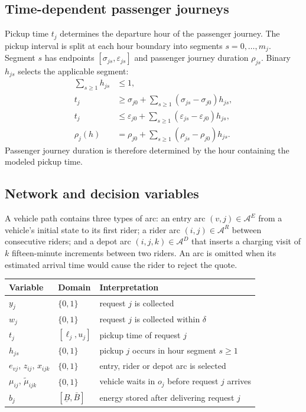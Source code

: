 \subsection{Time-dependent passenger journeys}

Pickup time $t_j$ determines the departure hour of the passenger journey. The pickup interval is split
at each hour boundary into segments $s=0,\ldots,m_j$. Segment $s$ has endpoints
$[\sigma_{js},\varepsilon_{js}]$ and passenger journey duration $\rho_{js}$. Binary $h_{js}$ selects
the applicable segment:
\begin{align}
  \textstyle\sum_{s\geq1} h_{js} &\leq 1, \\
  t_j &\geq \sigma_{j0} + \textstyle\sum_{s\geq1}(\sigma_{js}-\sigma_{j0})h_{js}, \\
  t_j &\leq \varepsilon_{j0} + \textstyle\sum_{s\geq1}(\varepsilon_{js}-\varepsilon_{j0})h_{js}, \\
  \rho_j(h) &= \rho_{j0} + \textstyle\sum_{s\geq1}(\rho_{js}-\rho_{j0})h_{js}.
  \label{eq:ride-duration}
\end{align}
Passenger journey duration is therefore determined by the hour containing the modeled pickup time.

\subsection{Network and decision variables}

A vehicle path contains three types of arc: an entry arc $(v,j)\in\mathcal A^E$ from a vehicle's
initial state to its first rider; a rider arc $(i,j)\in\mathcal A^R$ between consecutive riders; and a
depot arc $(i,j,k)\in\mathcal A^D$ that inserts a charging visit of $k$ fifteen-minute increments
between two riders. An arc is omitted when its estimated arrival time would cause the rider to reject
the quote.

\begin{center}
\begin{tabularx}{\textwidth}{@{}llX@{}}
\toprule
Variable & Domain & Interpretation \\
\midrule
$y_j$ & $\{0,1\}$ & request $j$ is collected \\
$w_j$ & $\{0,1\}$ & request $j$ is collected within $\delta$ \\
$t_j$ & $[\ell_j,u_j]$ & pickup time of request $j$ \\
$h_{js}$ & $\{0,1\}$ & pickup $j$ occurs in hour segment $s\geq1$ \\
$e_{vj}$, $z_{ij}$, $x_{ijk}$ & $\{0,1\}$ & entry, rider or depot arc is selected \\
$\mu_{ij}$, $\widetilde\mu_{ijk}$ & $\{0,1\}$ & vehicle waits in $o_j$ before request $j$ arrives \\
$b_j$ & $[\underline B,\bar B]$ & energy stored after delivering request $j$ \\
\bottomrule
\end{tabularx}
\end{center}

